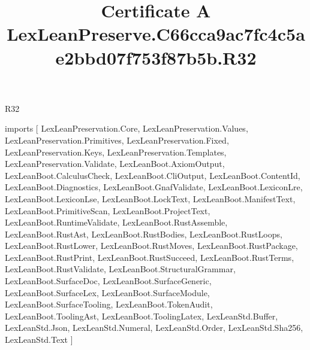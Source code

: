 \begin{lexlean}{R32}
\title{Certificate A LexLeanPreserve.C66cca9ac7fc4c5ae2bbd07f753f87b5b.R32}
\begin{coremodule}
imports [
  LexLeanPreservation.Core,
  LexLeanPreservation.Values,
  LexLeanPreservation.Primitives,
  LexLeanPreservation.Fixed,
  LexLeanPreservation.Keys,
  LexLeanPreservation.Templates,
  LexLeanPreservation.Validate,
  LexLeanBoot.AxiomOutput,
  LexLeanBoot.CalculusCheck,
  LexLeanBoot.CliOutput,
  LexLeanBoot.ContentId,
  LexLeanBoot.Diagnostics,
  LexLeanBoot.GnafValidate,
  LexLeanBoot.LexiconLre,
  LexLeanBoot.LexiconLse,
  LexLeanBoot.LockText,
  LexLeanBoot.ManifestText,
  LexLeanBoot.PrimitiveScan,
  LexLeanBoot.ProjectText,
  LexLeanBoot.RuntimeValidate,
  LexLeanBoot.RustAssemble,
  LexLeanBoot.RustAst,
  LexLeanBoot.RustBodies,
  LexLeanBoot.RustLoops,
  LexLeanBoot.RustLower,
  LexLeanBoot.RustMoves,
  LexLeanBoot.RustPackage,
  LexLeanBoot.RustPrint,
  LexLeanBoot.RustSucceed,
  LexLeanBoot.RustTerms,
  LexLeanBoot.RustValidate,
  LexLeanBoot.StructuralGrammar,
  LexLeanBoot.SurfaceDoc,
  LexLeanBoot.SurfaceGeneric,
  LexLeanBoot.SurfaceLex,
  LexLeanBoot.SurfaceModule,
  LexLeanBoot.SurfaceTooling,
  LexLeanBoot.TokenAudit,
  LexLeanBoot.ToolingAst,
  LexLeanBoot.ToolingLatex,
  LexLeanStd.Buffer,
  LexLeanStd.Json,
  LexLeanStd.Numeral,
  LexLeanStd.Order,
  LexLeanStd.Sha256,
  LexLeanStd.Text
]


\end{coremodule}
\end{lexlean}
